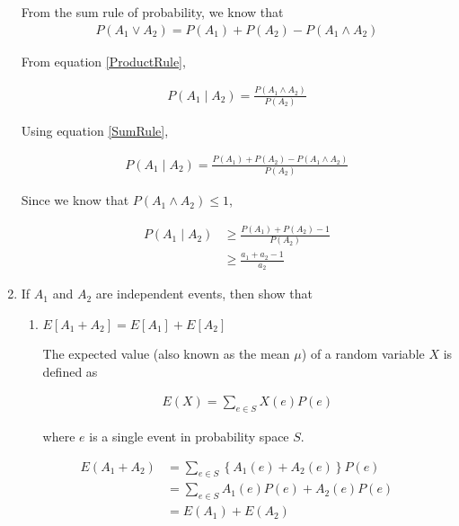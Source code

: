 \begin{enumerate}
From the sum rule of probability, we know that
\begin{equation}
\label{SumRule}
\begin{aligned}
P(A_1 \vee A_2) = P(A_1) + P(A_2) - P(A_1 \wedge A_2)  
\end{aligned}   
\end{equation}    
 
From equation \ref{ProductRule}, 

\begin{equation*}
\begin{aligned}
P(A_1 \mid A_2) = \frac{P(A_1 \wedge A_2)}{P(A_2)}
\end{aligned}   
\end{equation*}  

Using equation \ref{SumRule},

\begin{equation*}
\begin{aligned}
P(A_1 \mid A_2) = \frac{P(A_1) + P(A_2) - P(A_1 \wedge A_2)}{P(A_2)}
\end{aligned}   
\end{equation*}  

Since we know that $P(A_1 \wedge A_2) \leq 1$,

\begin{equation*}
\begin{aligned}
P(A_1 \mid A_2) &\geq \frac{P(A_1) + P(A_2) - 1}{P(A_2)}\\
&\geq \frac{a_1 + a_2 - 1}{a_2}
\end{aligned}   
\end{equation*}  

\item \relax[8 points] If $A_1$ and $A_2$ are independent events, then
  show that
  \begin{enumerate}
  \item $E[A_1 + A_2] = E[A_1] + E[A_2]$

The expected value (also known as the mean $\mu$) of a random variable $X$ is defined as 

\begin{equation*}
\begin{aligned}
E(X) = \sum_{e \in S} X(e) P(e)
\end{aligned}
\end{equation*} 

where $e$ is a single event in probability space $S$.
\end{enumerate}


\begin{equation*}
\begin{aligned}
E(A_1 + A_2) &= \sum_{e \in S} \left \{A_1(e) + A_2(e) \right \} P(e)\\
&= \sum_{e \in S} A_1(e) P(e)+ A_2(e) P(e)\\
&= E(A_1)  + E(A_2) 
\end{aligned}
\end{equation*}


\end{enumerate}
